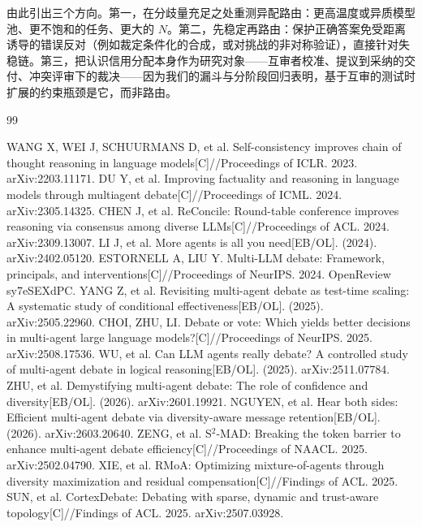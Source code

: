 \documentclass[UTF8,11pt]{ctexart}
\begin{document}
由此引出三个方向。第一，在分歧量充足之处重测异配路由：更高温度或异质模型池、更不饱和的任务、更大的 $N$。第二，先稳定再路由：保护正确答案免受距离诱导的错误反对（例如裁定条件化的合成，或对挑战的非对称验证），直接针对失稳链。第三，把认识信用分配本身作为研究对象——互审者校准、提议到采纳的交付、冲突评审下的裁决——因为我们的漏斗与分阶段回归表明，基于互审的测试时扩展的约束瓶颈是它，而非路由。

\begin{thebibliography}{99}

 WANG X, WEI J, SCHUURMANS D, et al. Self-consistency improves chain of thought reasoning in language models[C]//Proceedings of ICLR. 2023. arXiv:2203.11171.
 DU Y, et al. Improving factuality and reasoning in language models through multiagent debate[C]//Proceedings of ICML. 2024. arXiv:2305.14325.
 CHEN J, et al. ReConcile: Round-table conference improves reasoning via consensus among diverse LLMs[C]//Proceedings of ACL. 2024. arXiv:2309.13007.
 LI J, et al. More agents is all you need[EB/OL]. (2024). arXiv:2402.05120.
 ESTORNELL A, LIU Y. Multi-LLM debate: Framework, principals, and interventions[C]//Proceedings of NeurIPS. 2024. OpenReview sy7eSEXdPC.
 YANG Z, et al. Revisiting multi-agent debate as test-time scaling: A systematic study of conditional effectiveness[EB/OL]. (2025). arXiv:2505.22960.
 CHOI, ZHU, LI. Debate or vote: Which yields better decisions in multi-agent large language models?[C]//Proceedings of NeurIPS. 2025. arXiv:2508.17536.
 WU, et al. Can LLM agents really debate? A controlled study of multi-agent debate in logical reasoning[EB/OL]. (2025). arXiv:2511.07784.
 ZHU, et al. Demystifying multi-agent debate: The role of confidence and diversity[EB/OL]. (2026). arXiv:2601.19921.
 NGUYEN, et al. Hear both sides: Efficient multi-agent debate via diversity-aware message retention[EB/OL]. (2026). arXiv:2603.20640.
 ZENG, et al. S$^2$-MAD: Breaking the token barrier to enhance multi-agent debate efficiency[C]//Proceedings of NAACL. 2025. arXiv:2502.04790.
 XIE, et al. RMoA: Optimizing mixture-of-agents through diversity maximization and residual compensation[C]//Findings of ACL. 2025.
 SUN, et al. CortexDebate: Debating with sparse, dynamic and trust-aware topology[C]//Findings of ACL. 2025. arXiv:2507.03928.

\end{thebibliography}
\end{document}

